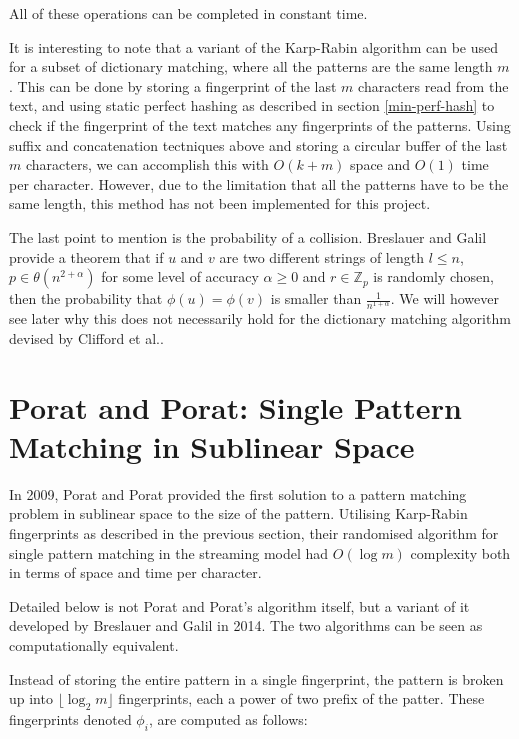 \documentclass[ %
                    author={Dominic Joseph Moylett},
                supervisor={Dr. Raphael Clifford and Dr. Benjamin Sach},
                    degree={MEng},
                     title={Dictionary Matching with Fingerprints},
                  subtitle={An Empirical Analysis},
                      type={Research},
                      year={2014} ]{dissertation}
\begin{document}
All of these operations can be completed in constant time.

It is interesting to note that a variant of the Karp-Rabin algorithm can be used for a subset of dictionary matching, where all the patterns are the same length $m$\cite[pp 205-206]{candan:data}. This can be done by storing a fingerprint of the last $m$ characters read from the text, and using static perfect hashing as described in section \ref{min-perf-hash} to check if the fingerprint of the text matches any fingerprints of the patterns. Using suffix and concatenation tectniques above and storing a circular buffer of the last $m$ characters, we can accomplish this with $O(k + m)$ space and $O(1)$ time per character. However, due to the limitation that all the patterns have to be the same length, this method has not been implemented for this project.

The last point to mention is the probability of a collision. Breslauer and Galil\cite{Breslauer:2014:RSS:2660854.2635814} provide a theorem that if $u$ and $v$ are two different strings of length $l \leq n$, $p \in \theta(n^{2 + \alpha})$ for some level of accuracy $\alpha \geq 0$ and $r \in \mathbb{Z}_p$ is randomly chosen, then the probability that $\phi(u) = \phi(v)$ is smaller than $\frac{1}{n^{1 + \alpha}}$. We will however see later why this does not necessarily hold for the dictionary matching algorithm devised by Clifford et al..

\section{Porat and Porat: Single Pattern Matching in Sublinear Space}

\noindent
In 2009, Porat and Porat\cite{5438620} provided the first solution to a pattern matching problem in sublinear space to the size of the pattern. Utilising Karp-Rabin fingerprints as described in the previous section, their randomised algorithm for single pattern matching in the streaming model had $O(\log m)$ complexity both in terms of space and time per character.

Detailed below is not Porat and Porat's algorithm itself, but a variant of it developed by Breslauer and Galil in 2014\cite{Breslauer:2014:RSS:2660854.2635814}. The two algorithms can be seen as computationally equivalent.

Instead of storing the entire pattern in a single fingerprint, the pattern is broken up into $\lfloor \log_2 m\rfloor$ fingerprints, each a power of two prefix of the patter. These fingerprints denoted $\phi_i$, are computed as follows:
\end{document}
